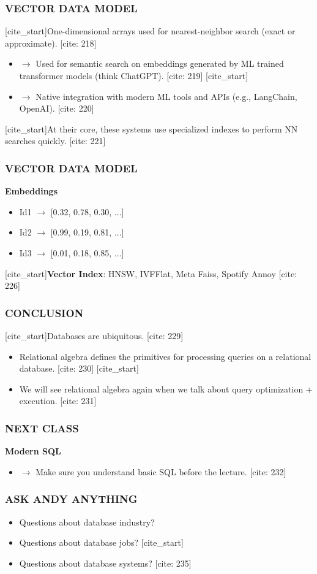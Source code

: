 \documentclass[aspectratio=169]{beamer}
\begin{document}
\begin{frame}
    \frametitle{VECTOR DATA MODEL}
    [cite_start]One-dimensional arrays used for nearest-neighbor search (exact or approximate). [cite: 218]
    \begin{itemize}
        [cite_start]\item $\rightarrow$ Used for semantic search on embeddings generated by ML trained transformer models (think ChatGPT). [cite: 219]
        [cite_start]\item $\rightarrow$ Native integration with modern ML tools and APIs (e.g., LangChain, OpenAI). [cite: 220]
    \end{itemize}
    [cite_start]At their core, these systems use specialized indexes to perform NN searches quickly. [cite: 221]
\end{frame}

\begin{frame}
    \frametitle{VECTOR DATA MODEL}
    \textbf{Embeddings}
    \begin{itemize}
        \item Id1 $\rightarrow$ [0.32, 0.78, 0.30, ...]
        \item Id2 $\rightarrow$ [0.99, 0.19, 0.81, ...]
        \item Id3 $\rightarrow$ [0.01, 0.18, 0.85, ...]
    \end{itemize}
    \vspace{1em}
    [cite_start]\textbf{Vector Index}: HNSW, IVFFlat, Meta Faiss, Spotify Annoy [cite: 226]
\end{frame}

\begin{frame}
    \frametitle{CONCLUSION}
    [cite_start]Databases are ubiquitous. [cite: 229]
    \begin{itemize}
        [cite_start]\item Relational algebra defines the primitives for processing queries on a relational database. [cite: 230]
        [cite_start]\item We will see relational algebra again when we talk about query optimization + execution. [cite: 231]
    \end{itemize}
\end{frame}

\begin{frame}
    \frametitle{NEXT CLASS}
    \textbf{Modern SQL}
    \begin{itemize}
        [cite_start]\item $\rightarrow$ Make sure you understand basic SQL before the lecture. [cite: 232]
    \end{itemize}
\end{frame}

\begin{frame}
    \frametitle{ASK ANDY ANYTHING}
    \begin{itemize}
        \item Questions about database industry?
        \item Questions about database jobs?
        [cite_start]\item Questions about database systems? [cite: 235]
    \end{itemize}
\end{frame}
\end{document}
